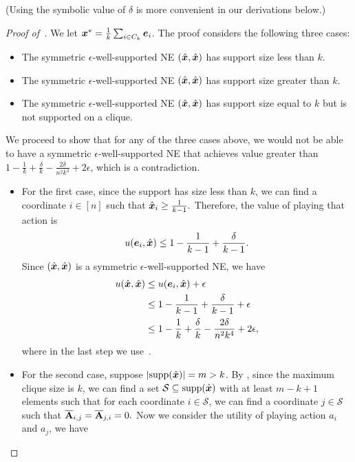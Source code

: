 (Using the symbolic value of $\delta$ is more convenient in our derivations below.)

\begin{proof}[Proof of~]
    We let ${\bm{x}}^* = \frac{1}{k} \sum_{i \in C_k} {\bm{e}}_{i}$. The proof considers the following three cases:
    \begin{itemize}
        \item The symmetric $\epsilon$-well-supported NE $(\hat{{\bm{x}}}, \hat{{\bm{x}}})$ has support size less than $k$.
        \item The symmetric $\epsilon$-well-supported NE $(\hat{{\bm{x}}}, \hat{{\bm{x}}})$ has support size greater than $k$.
        \item The symmetric $\epsilon$-well-supported NE $(\hat{{\bm{x}}}, \hat{{\bm{x}}})$ has support size equal to $k$ but is not supported on a clique.
    \end{itemize}
    We proceed to show that for any of the three cases above, we would not be able to have a symmetric $\epsilon$-well-supported NE that achieves value greater than $1 - \frac{1}{k} + \frac{\delta}{k} - \frac{2\delta}{ n^2k^4} + 2 \epsilon$, which is a contradiction.
    \begin{itemize}
        \item For the first case, since the support has size less than $k$, we can find a coordinate $i \in [n]$ such that $\hat{{\bm{x}}}_i \geq \frac{1}{k - 1}.$ Therefore, the value of playing that action is 
        \begin{align*}
            u({\bm{e}}_i, \hat{{\bm{x}}}) \leq 1 - \frac{1}{k - 1} + \frac{\delta}{k - 1}.
        \end{align*}  
        Since $(\hat{{\bm{x}}}, \hat{{\bm{x}}})$ is a symmetric $\epsilon$-well-supported NE, we have
        \begin{align*}
            u(\hat{{\bm{x}}}, \hat{{\bm{x}}}) & \leq u({\bm{e}}_i, \hat{{\bm{x}}}) + \epsilon \\
            & \leq 1 - \frac{1}{k - 1} + \frac{\delta}{k - 1} + \epsilon \\
            & \leq 1 - \frac{1}{k} +\frac{\delta}{k} - \frac{2\delta}{n^2k^4} + 2\epsilon,
        \end{align*}
        where in the last step we use~.
        \item For the second case, suppose $|\text{supp}(\hat{{\bm{x}}})| = m > k$. By , since the maximum clique size is $k$, we can find a set $\mathcal{S} \subseteq \text{supp}(\hat{{\bm{x}}})$ with at least $m - k + 1$ elements such that for each coordinate $i \in \mathcal{S}$, we can find a coordinate $j \in \mathcal{S}$ such that $\overline{\mathbf{A}}_{i, j} = \overline{\mathbf{A}}_{j, i} = 0.$ Now we consider the utility of playing action $a_i$ and $a_j$, we have

\end{itemize}
\end{proof}
